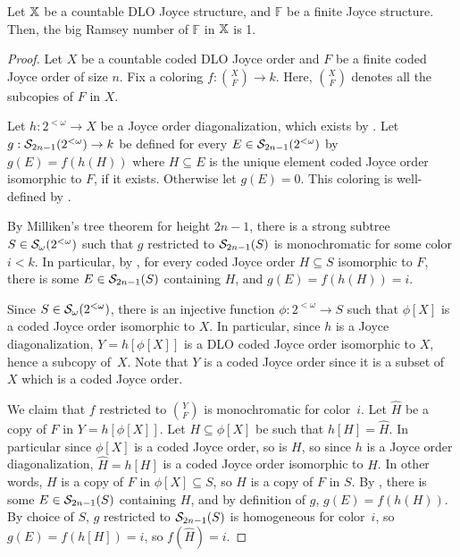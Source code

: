 \begin{theorem}[$\ACA_0$]\label{thm:strong-devlin-one-type}
  Let $\mathbb{X}$ be a countable DLO Joyce structure, and $\mathbb{F}$ be a finite Joyce structure. Then, the big Ramsey number of $\mathbb{F}$ in $\mathbb{X}$ is 1.
\end{theorem}
\begin{proof}
Let $X$ be a countable coded DLO Joyce order and $F$ be a finite coded Joyce order of size $n$. Fix a coloring $f: {X \choose F} \to k$. Here, ${X \choose F}$ denotes all the subcopies of $F$ in $X$.

Let $h: 2^{<\omega} \to X$ be a Joyce order diagonalization, which exists by . Let $g: \mathcal{S}_{2n-1}({2^{<\omega}}) \to k$ be defined for every $E \in \mathcal{S}_{2n-1}({2^{<\omega}})$ by $g(E) = f(h(H))$ where $H \subseteq E$ is the unique element coded Joyce order isomorphic to $F$, if it exists. Otherwise let $g(E) = 0$. This coloring is well-defined by .


By Milliken's tree theorem for height $2n-1$, there is a strong subtree $S \in \mathcal{S}_{\omega}({2^{<\omega}})$ such that $g$ restricted to $\mathcal{S}_{2n-1}({S})$ is monochromatic for some color $i < k$. In particular, by , for every coded Joyce order $H \subseteq S$ isomorphic to $F$, there is some $E \in \mathcal{S}_{2n-1}({S})$ containing $H$, and $g(E) = f(h(H)) = i$. 

Since $S \in \mathcal{S}_{\omega}({2^{<\omega}})$, there is an injective function $\phi: 2^{<\omega} \to S$ such that $\phi[X]$ is a coded Joyce order isomorphic to $X$. 
In particular, since $h$ is a Joyce diagonalization, $Y = h[\phi[X]]$ is a DLO coded Joyce order isomorphic to $X$, hence a subcopy of~$X$. Note that $Y$ is a coded Joyce order since it is a subset of $X$ which is a coded Joyce order.  

We claim that $f$ restricted to ${Y \choose F}$ is monochromatic for color~$i$.
Let $\hat{H}$ be a copy of $F$ in $Y = h[\phi[X]]$. Let $H \subseteq \phi[X]$ be such that $h[H] = \hat{H}$. In particular since $\phi[X]$ is a coded Joyce order, so is $H$, so since $h$ is a Joyce order diagonalization, $\hat{H} = h[H]$ is a coded Joyce order isomorphic to $H$. In other words, $H$ is a copy of $F$ in $\phi[X] \subseteq S$, so $H$ is a copy of $F$ in $S$. 
	By , there is some $E \in \mathcal{S}_{2n-1}({S})$ containing $H$, and by definition of $g$, $g(E) = f(h(H))$.  By choice of $S$, $g$ restricted to $\mathcal{S}_{2n-1}({S})$ is homogeneous for color~$i$, so $g(E) = f(h[H]) = i$, so $f(\hat{H}) = i$. 
\end{proof}




